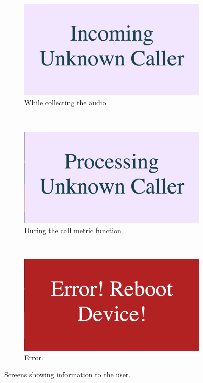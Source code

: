 \documentclass[main.tex]{subfiles}
\begin{document}
\begin{figure}[H]
	\captionsetup[subfigure]{position=b}
        \centering
        \begin{subfigure}{0.45\textwidth}
                \includegraphics[width=\textwidth]{pics/state3}
                \caption{While collecting the audio.}
                \label{fig:state3}
        \end{subfigure}
        ~
        \begin{subfigure}{0.45\textwidth}
                \includegraphics[width=\textwidth]{pics/state5}
                \caption{During the call metric function.}
                \label{fig:state5}
        \end{subfigure}
		\\
		\begin{subfigure}{0.45\textwidth}
				\includegraphics[width=\textwidth]{pics/state9}
				\caption{Error.}
				\label{fig:state9}
		\end{subfigure}
	\caption{Screens showing information to the user.}
	\label{fig:statesmore}
\end{figure}
\end{document}
